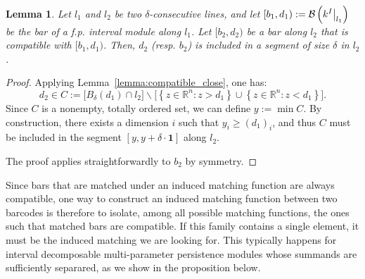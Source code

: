 \documentclass{article}
\newcommand{\barcode}[1]{ {\mathcal B}\left(#1\right) }
\newcommand\restr[2]{{  \left.\kern-\nulldelimiterspace #1 \vphantom{\big|} \right|_{#2}  }}
\newtheorem{lemma}[theorem]{Lemma}
\newcommand{\rebuttal}[1]{{ #1}}
\begin{document}
\begin{lemma}\label{lemma:consecutive_segment}
	Let $l_1$ and $l_2$ be two $\delta$-consecutive lines, and let $[b_1,d_1):=\barcode{\restr{\rebuttal{k^{I}}}{l_1}}$ be the bar of a \rebuttal{f.p.} interval module along $l_1$. %
	Let $[b_2,d_2)$ be a bar along $l_2$ that is compatible with $[b_1,d_1)$. Then, $d_2$ (resp. $b_2$) is included in a segment of size $ \delta$ in $l_2$. %
\end{lemma}
\begin{proof}
	Applying Lemma~\ref{lemma:compatible_close},
	one has:
	\begin{equation*}
		d_2 \in C :=
		\big[B_{ \delta }(d_1)\cap l_2\big]
		\backslash
		\big[ \left\{ z\in \mathbb R^n : z>d_1 \right\} \cup \left\{ z\in \mathbb R^n : z<d_1 \right\}\big].
	\end{equation*}
	Since $C$ is a nonempty, totally ordered set, we can define $y := \min C$. By construction, there exists a dimension $i$ such that
	$y_i\ge (d_1)_i$, and thus $C$ must be included in the segment $[y, y+\delta\cdot\mathbf{1}]$ along $l_2$. %

	The proof applies straightforwardly to $b_2$ by symmetry.
\end{proof}

Since bars that are matched under an \rebuttal{induced} matching function are always compatible,
one way to construct an \rebuttal{induced} matching function between two barcodes is therefore to isolate, among all possible matching functions, the ones %
such that matched bars are compatible. If this family contains a single element, it must be the \rebuttal{induced} matching we are looking for.
This typically happens for interval decomposable multi-parameter persistence modules whose summands are sufficiently separared, as we show in the proposition below. \\
\end{document}
